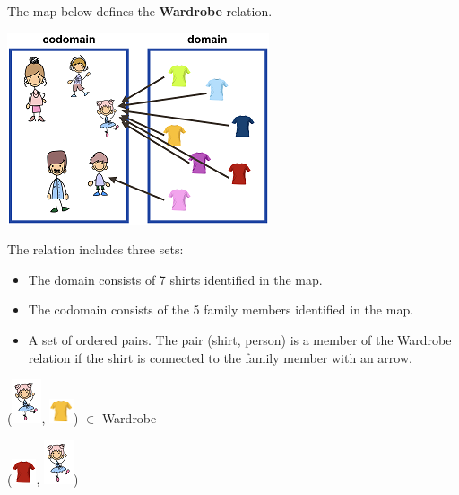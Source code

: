 \documentclass{ximera}
\begin{document}
\begin{definition}
  The map below defines the \textbf{Wardrobe} relation.
  
  

    \includegraphics[width=292px,height=213px]{pics/r4.png}

  
 

  The  relation includes three sets:
    \begin{itemize}
    \item The domain consists of 7 shirts identified in the map.
    \item The codomain consists of the 5 family members identified in the map.
    \item A set of ordered pairs. The pair (shirt, person) is a member of the Wardrobe relation if the shirt is connected to the family member with an arrow.
    \end{itemize}

  
\end{definition}



\begin{exercise}

 ({\includegraphics[width=33px,height=49px]{pics/elements/family/family2.png}}, {\includegraphics[width=27px,height=28px]{pics/elements/shirts/shirts2.png}}) $\in$ Wardrobe 

  \begin{multipleChoice}
  \end{multipleChoice}
  \begin{feedback}
({\includegraphics[width=27px,height=28px]{pics/elements/shirts/shirts1.png}},  {\includegraphics[width=33px,height=49px]{pics/elements/family/family2.png}})
  \end{feedback}
\end{exercise}
\end{document}
